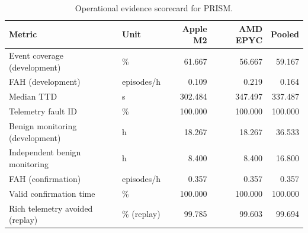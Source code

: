 \begin{table}
\caption{Operational evidence scorecard for PRISM.}
\label{tab:prism_operational_scorecard}
\begin{tabular}{llrrr}
\toprule
Metric & Unit & Apple M2 & AMD EPYC & Pooled \\
\midrule
Event coverage (development) & \% & 61.667 & 56.667 & 59.167 \\
FAH (development) & episodes/h & 0.109 & 0.219 & 0.164 \\
Median TTD & s & 302.484 & 347.497 & 337.487 \\
Telemetry fault ID & \% & 100.000 & 100.000 & 100.000 \\
Benign monitoring (development) & h & 18.267 & 18.267 & 36.533 \\
Independent benign monitoring & h & 8.400 & 8.400 & 16.800 \\
FAH (confirmation) & episodes/h & 0.357 & 0.357 & 0.357 \\
Valid confirmation time & \% & 100.000 & 100.000 & 100.000 \\
Rich telemetry avoided (replay) & \% (replay) & 99.785 & 99.603 & 99.694 \\
\bottomrule
\end{tabular}
\end{table}
